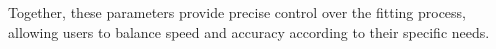 \documentclass[edipack2.tex]{subfiles}
\begin{document}
Together, these parameters provide precise control over the fitting 
process, allowing users to balance speed and accuracy according to 
their specific needs.



\end{document}
